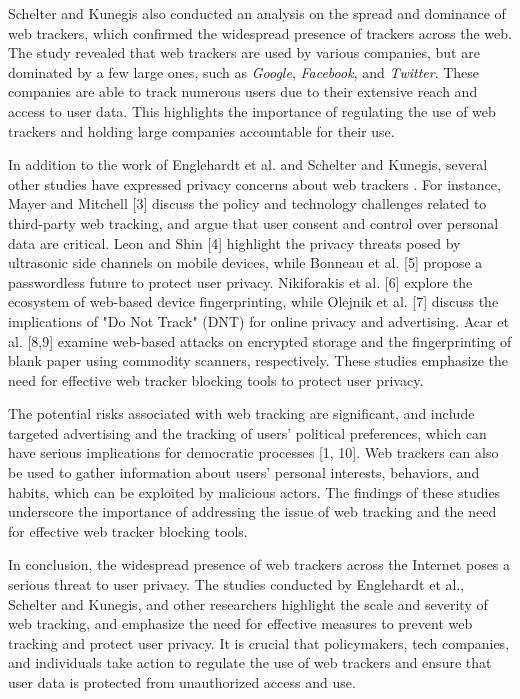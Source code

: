 Schelter and Kunegis \cite{schelter2018ubiquity} also conducted an analysis
on the spread and dominance of web trackers, which confirmed the widespread
presence of trackers across the web. The study revealed that web trackers
are used by various companies, but are dominated by a few large ones,
such as \textit{Google}, \textit{Facebook}, and \textit{Twitter}. These companies are able
to track numerous users due to their extensive reach and
access to user data. This highlights the importance of regulating 
the use of web trackers and holding large companies accountable for their use.


In addition to the work of Englehardt et al. and Schelter and Kunegis,
several other studies have expressed privacy concerns about web trackers \cite{bujlow2017survey,chaabane2012big}.
For instance, Mayer and Mitchell [3] discuss the policy and technology 
challenges related to third-party web tracking, and argue that user consent
and control over personal data are critical. Leon and Shin [4] highlight the
privacy threats posed by ultrasonic side channels on mobile devices, while
Bonneau et al. [5] propose a passwordless future to protect user privacy.
Nikiforakis et al. [6] explore the ecosystem of web-based device fingerprinting,
while Olejnik et al. [7] discuss the implications of "Do Not Track" (DNT)
for online privacy and advertising. Acar et al. [8,9] examine web-based attacks
on encrypted storage and the fingerprinting of blank paper using commodity
scanners, respectively. These studies emphasize the need for effective
web tracker blocking tools to protect user privacy.

The potential risks associated with web tracking are significant,
and include targeted advertising and the tracking of users' political
preferences, which can have serious implications for democratic
processes [1, 10]. Web trackers can also be used to gather information
about users' personal interests, behaviors, and habits, which can be
exploited by malicious actors. The findings of these studies underscore
the importance of addressing the issue of web tracking and the need
for effective web tracker blocking tools.

In conclusion, the widespread presence of web trackers across the Internet
poses a serious threat to user privacy. The studies conducted
by Englehardt et al., Schelter and Kunegis, and other researchers
highlight the scale and severity of web tracking, and emphasize
the need for effective measures to prevent web tracking and
protect user privacy. It is crucial that policymakers, tech companies,
and individuals take action to regulate the use of web trackers
and ensure that user data is protected from unauthorized access and use.


